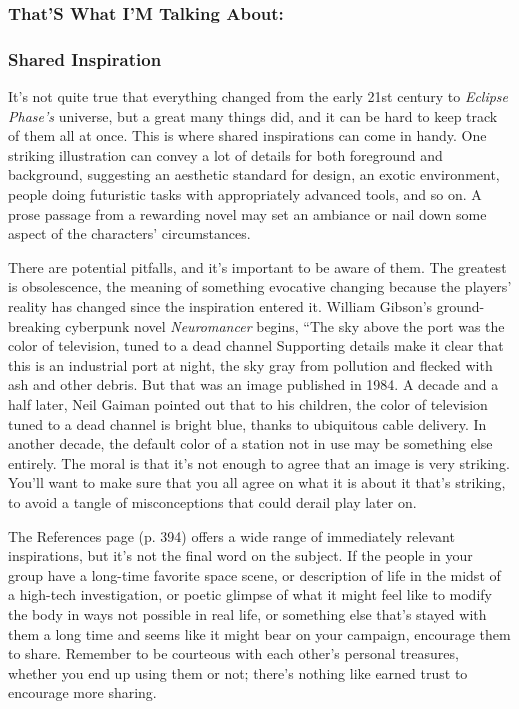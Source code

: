 \subsubsection{That'S What I'M Talking About:}


\subsubsection{Shared Inspiration }

It's not quite true that everything changed from the 
early 21st century to \textit{Eclipse Phase's} universe, but a 
great many things did, and it can be hard to keep track 
of them all at once. This is where shared inspirations 
can come in handy. One striking illustration can convey 
a lot of details for both foreground and background, 
suggesting an aesthetic standard for design, an exotic 
environment, people doing futuristic tasks with appropriately
advanced tools, and so on. A prose passage
from a rewarding novel may set an ambiance or nail 
down some aspect of the characters' circumstances. 

There are potential pitfalls, and it's important to 
be aware of them. The greatest is obsolescence, the 
meaning of something evocative changing because 
the players' reality has changed since the inspiration 
entered it. William Gibson's ground-breaking cyberpunk
novel \textit{Neuromancer }begins, ``The sky above the
port was the color of television, tuned to a dead channel
Supporting details make it clear that this is an
industrial port at night, the sky gray from pollution 
and flecked with ash and other debris. But that was 
an image published in 1984. A decade and a half later, 
Neil Gaiman pointed out that to his children, the 
color of television tuned to a dead channel is bright 
blue, thanks to ubiquitous cable delivery. In another 
decade, the default color of a station not in use may 
be something else entirely. The moral is that it's not 
enough to agree that an image is very striking. You'll 
want to make sure that you all agree on what it is 
about it that's striking, to avoid a tangle of misconceptions
that could derail play later on.

The References page (p. 394) offers a wide range 
of immediately relevant inspirations, but it's not the 
final word on the subject. If the people in your group 
have a long-time favorite space scene, or description 
of life in the midst of a high-tech investigation, or 
poetic glimpse of what it might feel like to modify the 
body in ways not possible in real life, or something 
else that's stayed with them a long time and seems 
like it might bear on your campaign, encourage them 
to share. Remember to be courteous with each other's 
personal treasures, whether you end up using them 
or not; there's nothing like earned trust to encourage 
more sharing. 

